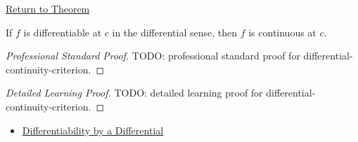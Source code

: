 \newpage
{}
\label{prf:differential-continuity-criterion}

\begin{remark*}[Return]
\hyperref[thm:differential-continuity-criterion]{Return to Theorem}
\end{remark*}

\begin{theorem*}
If $f$ is differentiable at $c$ in the differential sense, then $f$ is continuous at $c$.
\end{theorem*}

\begin{proof}[Professional Standard Proof]
\LRAProofBodyStart
TODO: professional standard proof for differential-continuity-criterion.
\end{proof}

\begin{proof}[Detailed Learning Proof]
\LRAProofBodyStart
TODO: detailed learning proof for differential-continuity-criterion.
\end{proof}

\begin{remark*}
\end{remark*}

\begin{dependencies}
\begin{itemize}
  \item \hyperref[def:differentiability-by-a-differential]{Differentiability by a Differential}
\end{itemize}
\end{dependencies}

\clearpage
